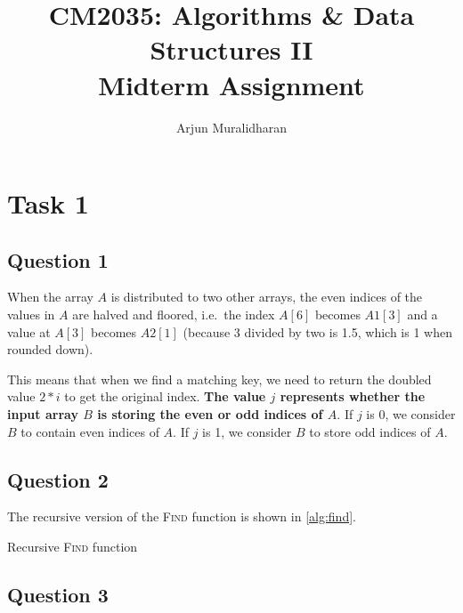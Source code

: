 \title{CM2035: Algorithms \& Data Structures II \\ Midterm Assignment}
\author{Arjun Muralidharan}



\section{Task 1}
\subsection{Question 1}
When the array $A$ is distributed to two other arrays, the even indices of the values in $A$ are halved and floored, i.e.\ the index $A[6]$ becomes $A1[3]$ and a value at $A[3]$ becomes $A2[1]$ (because 3 divided by two is 1.5, which is 1 when rounded down).

This means that when we find a matching key, we need to return the doubled value $2*i$ to get the original index. \textbf{The value $j$ represents whether the input array $B$ is storing the even or odd indices of $A$}. If $j$ is 0, we consider $B$ to contain even indices of $A$. If $j$ is 1, we consider $B$ to store odd indices of $A$.

\subsection{Question 2}

The recursive version of the \textsc{Find} function is shown in \autoref{alg:find}.

\begin{algorithm}[H]
    \caption{Recursive \textsc{Find} function }\label{alg:find}
    \begin{algorithmic}

        \EndIf{}

        \EndIf{}


        \EndFunction{}
    \end{algorithmic}
\end{algorithm}

\subsection{Question 3}

